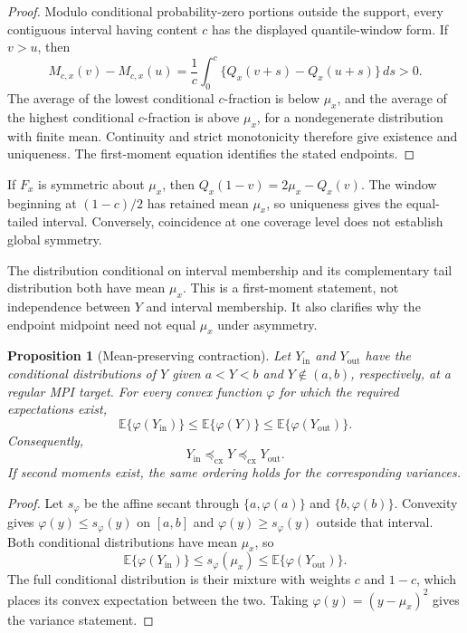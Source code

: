 \documentclass[11pt]{article}
\newcommand{\E}{\mathbb{E}}
\newtheorem{proposition}{Proposition}
\begin{document}
\begin{proof}
Modulo conditional probability-zero portions outside the support, every
contiguous interval having content \(c\) has the displayed
quantile-window form. If \(v>u\), then
\[
M_{c,x}(v)-M_{c,x}(u)
=\frac{1}{c}\int_0^c
\{Q_x(v+s)-Q_x(u+s)\}\,ds>0.
\]
The average of the lowest conditional \(c\)-fraction is below \(\mu_x\), and
the average of the highest conditional \(c\)-fraction is above \(\mu_x\), for
a nondegenerate distribution with finite mean. Continuity and strict
monotonicity therefore give existence and uniqueness. The first-moment
equation identifies the stated endpoints.
\end{proof}

If \(F_x\) is symmetric about \(\mu_x\), then
\(Q_x(1-v)=2\mu_x-Q_x(v)\). The window beginning at
\((1-c)/2\) has retained mean \(\mu_x\), so uniqueness gives the equal-tailed
interval. Conversely, coincidence at one coverage level does not establish
global symmetry.

The distribution conditional on interval membership and its complementary
tail distribution both have mean \(\mu_x\). This is a first-moment statement,
not independence between \(Y\) and interval membership. It also clarifies why
the endpoint midpoint need not equal \(\mu_x\) under asymmetry.

\begin{proposition}[Mean-preserving contraction]
\label{prop:supp-convex-order}
Let \(Y_{\mathrm{in}}\) and \(Y_{\mathrm{out}}\) have the conditional
distributions of \(Y\) given \(a<Y<b\) and \(Y\notin(a,b)\), respectively,
at a regular MPI target. For every convex function \(\varphi\) for
which the required expectations exist,
\[
\E\{\varphi(Y_{\mathrm{in}})\}
\le
\E\{\varphi(Y)\}
\le
\E\{\varphi(Y_{\mathrm{out}})\}.
\]
Consequently,
\[
Y_{\mathrm{in}}\preceq_{\mathrm{cx}}Y
\preceq_{\mathrm{cx}}Y_{\mathrm{out}}.
\]
If second moments exist, the same ordering holds for the corresponding
variances.
\end{proposition}

\begin{proof}
Let \(s_\varphi\) be the affine secant through
\(\{a,\varphi(a)\}\) and \(\{b,\varphi(b)\}\). Convexity gives
\(\varphi(y)\le s_\varphi(y)\) on \([a,b]\) and
\(\varphi(y)\ge s_\varphi(y)\) outside that interval. Both conditional
distributions have mean \(\mu_x\), so
\[
\E\{\varphi(Y_{\mathrm{in}})\}
\le s_\varphi(\mu_x)
\le \E\{\varphi(Y_{\mathrm{out}})\}.
\]
The full conditional distribution is their mixture with weights \(c\) and
\(1-c\), which places its convex expectation between the two. Taking
\(\varphi(y)=(y-\mu_x)^2\) gives the variance statement.
\end{proof}
\end{document}

